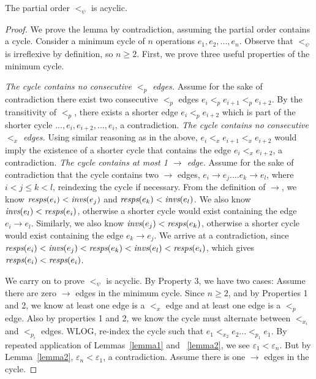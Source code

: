 \begin{lem}
\label{lemmamain}
The partial order $<_\psi$ is acyclic.
\end{lem}
\begin{proof}
We prove the lemma by contradiction, assuming the partial order contains a cycle. Consider a minimum cycle of $n$ operations $e_1,e_2,...,e_n$. Observe that $<_\psi$ is irreflexive by definition, so $n \geq 2$. First, we prove three useful properties of the minimum cycle.

 \textit{The cycle contains no consecutive $<_p$ edges.} {Assume for the sake of contradiction there exist two consecutive $<_p$ edges $e_i <_p e_{i+1} <_p e_{i+2}$. By the transitivity of $<_p$, there exists a shorter edge $e_i <_p e_{i+2}$ which is part of the shorter cycle $..., e_i, e_{i+2}, ..., e_i$, a contradiction.}
 \textit{The cycle contains no consecutive $<_x$ edges.} {Using similar reasoning as in the above, $e_i <_x e_{i+1} <_x e_{i+2}$ would imply the existence of a shorter cycle that contains the edge $e_i <_x e_{i+2}$, a contradiction.}
 \textit{The cycle contains at most 1 $\rightarrow$ edge.} Assume for the sake of contradiction that the cycle contains two $\rightarrow$ edges, $e_i \rightarrow e_j .... e_k \rightarrow e_l$, where $i < j \leq k < l$, reindexing the cycle if necessary. From the definition of $\rightarrow$, we know $\operatorname*{\textit{resps}}(e_i) < \operatorname*{\textit{invs}}(e_j)$ and $\operatorname*{\textit{resps}}(e_k) < \operatorname*{\textit{invs}}(e_l)$. We also know $\operatorname*{\textit{invs}}(e_l) < \operatorname*{\textit{resps}}(e_i)$, otherwise a shorter cycle would exist containing the edge $e_i \rightarrow e_l$. Similarly, we also know $\operatorname*{\textit{invs}}(e_j) < \operatorname*{\textit{resps}}(e_k)$, otherwise a shorter cycle would exist containing the edge $e_k \rightarrow e_j$. We arrive at a contradiction, since $\operatorname*{\textit{resps}}(e_i) < \operatorname*{\textit{invs}}(e_j) < \operatorname*{\textit{resps}}(e_k) < \operatorname*{\textit{invs}}(e_l) < \operatorname*{\textit{resps}}(e_i)$, which gives $\operatorname*{\textit{resps}}(e_i) < \operatorname*{\textit{resps}}(e_i)$.

We carry on to prove $<_\psi$ is acyclic. By Property 3, we have two cases:
 Assume there are zero $\rightarrow$ edges in the minimum cycle. Since $n \geq 2$, and by Properties 1 and 2, we know at least one edge is a $<_x$ edge and at least one edge is a $<_p$ edge. Also by properties 1 and 2, we know the cycle must alternate between $<_{x_i}$ and $<_{p_i}$ edges. WLOG, re-index the cycle such that $e_1 <_{x_2} e_2 ... <_{p_1} e_1$.
By repeated application of Lemmas~\ref{lemma1} and ~\ref{lemma2}, we see $\varepsilon_1 < \varepsilon_n$. But by Lemma~\ref{lemma2}, $\varepsilon_n < \varepsilon_1$, a contradiction.
 Assume there is one $\rightarrow$ edges in the cycle.

\end{proof}